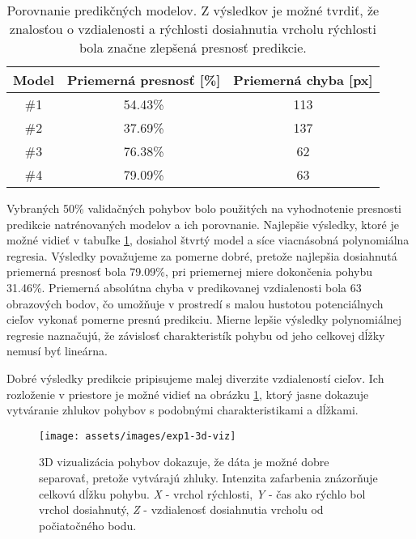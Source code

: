 \begin{table}[]
\centering
\begin{tabular}{ccc}
\multicolumn{1}{l}{\textbf{Model}} & \multicolumn{1}{l}{\textbf{Priemerná presnosť {[}\%{]}}} & \multicolumn{1}{l}{\textbf{Priemerná chyba {[}px{]}}} \\ \hline
\#1                                & 54.43\%                                                  & 113                                                   \\
\#2                                & 37.69\%                                                  & 137                                                   \\
\#3                                & 76.38\%                                                  & 62                                                    \\
\#4                                & 79.09\%                                                  & 63                                                   
\end{tabular}
\caption{Porovnanie predikčných modelov. Z výsledkov je možné tvrdiť, že znalosťou o vzdialenosti a rýchlosti dosiahnutia vrcholu rýchlosti bola značne zlepšená presnosť predikcie.}
\label{tab:proposal-test}
\end{table}

Vybraných 50\% validačných pohybov bolo použitých na vyhodnotenie presnosti predikcie natrénovaných modelov a ich porovnanie. Najlepšie výsledky, ktoré je možné vidieť v tabuľke \ref{tab:proposal-test}, dosiahol štvrtý model a síce viacnásobná polynomiálna regresia. Výsledky považujeme za pomerne dobré, pretože najlepšia dosiahnutá priemerná presnosť bola 79.09\%, pri priemernej miere dokončenia pohybu 31.46\%. Priemerná absolútna chyba v predikovanej vzdialenosti bola 63 obrazových bodov, čo umožňuje v prostredí s malou hustotou potenciálnych cieľov vykonať pomerne presnú predikciu. Mierne lepšie výsledky polynomiálnej regresie naznačujú, že závislosť charakteristík pohybu od jeho celkovej dĺžky nemusí byť lineárna.

Dobré výsledky predikcie pripisujeme malej diverzite vzdialeností cieľov. Ich rozloženie v priestore je možné vidieť na obrázku \ref{fig:exp1-3d-viz}, ktorý jasne dokazuje vytváranie zhlukov pohybov s podobnými charakteristikami a dĺžkami.

\begin{figure}[h]
\centering
\texttt{[image: assets/images/exp1-3d-viz]}
\caption{3D vizualizácia pohybov dokazuje, že dáta je možné dobre separovať, pretože vytvárajú zhluky. Intenzita zafarbenia znázorňuje celkovú dĺžku pohybu. \emph{X} - vrchol rýchlosti, \emph{Y} - čas ako rýchlo bol vrchol dosiahnutý, \emph{Z} - vzdialenosť dosiahnutia vrcholu od počiatočného bodu.\label{fig:exp1-3d-viz}}
\end{figure}

